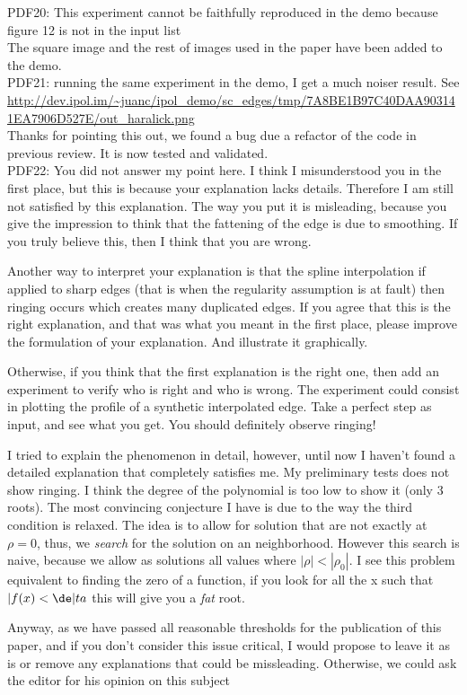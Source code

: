 \documentclass[a4paper,10pt]{report}
\begin{document}
\que PDF20: This experiment cannot be faithfully reproduced in the demo because figure 12 is not in the input list\\

\ans The square image and the rest of images used in the paper have been added to the demo.\\

\que PDF21: running the same experiment in the demo, I get a much noiser result. See
\url{http://dev.ipol.im/~juanc/ipol_demo/sc_edges/tmp/7A8BE1B97C40DAA903141EA7906D527E/out_haralick.png}\\
\ans Thanks for pointing this out, we found a bug due a refactor of the code in previous review. It is now tested and validated.\\


\que PDF22: You did not answer my point here. I think I misunderstood you in the first place, but this is because your explanation lacks details. Therefore I am still not satisfied by this explanation. 
The way you put it is misleading, because you give the impression to think that the fattening of the edge is due to smoothing. If you truly believe this, then I think that you are wrong.

Another way to interpret your explanation is that the spline interpolation if applied to sharp edges (that is when the regularity assumption is at fault) then ringing occurs which creates many duplicated edges. If you agree that this is the right explanation, and that was what you meant in the first place, please improve the formulation of your explanation. And illustrate it graphically.

Otherwise, if you think that the first explanation is the right one, then add an experiment to verify who is right and who is wrong. The experiment could consist in  plotting  the profile of a synthetic interpolated edge. Take a perfect step as input, and see what you get. You should definitely observe ringing!

\ans I tried to explain the phenomenon in detail, however, until now I haven't found a detailed explanation that completely satisfies me. My preliminary tests does not show ringing. I think the degree of the polynomial is too low to show it (only 3 roots).
The most convincing conjecture I have is due to the way the third condition is relaxed. The idea is to allow for solution that are not exactly at $\rho=0$, thus, we \emph{search} for the solution on an neighborhood. However this search is naive, because we allow as solutions all values where $|\rho|<|\rho_0|$. I see this problem equivalent to finding the zero of a function, if you look for all the x such that $|f(x)<\de|ta$ this will give you a \emph{fat} root.

Anyway, as we have passed all reasonable thresholds for the publication of this paper, and if you don't consider this issue critical, I would propose to leave it as is or remove any explanations that could be missleading. Otherwise, we could ask the editor for his opinion on this subject



\end{document}
